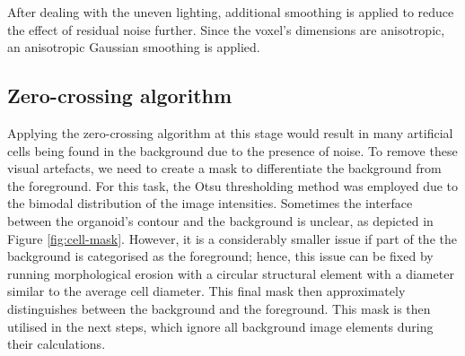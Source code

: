 \documentclass[
  digital,     %
  oneside,     %
  nosansbold,  %
  nocolorbold, %
  lof,         %
  lot,         %
]{fithesis4}
\begin{document}
After dealing with the uneven lighting, additional smoothing is applied
to reduce the effect of residual noise further. Since the voxel's dimensions are
anisotropic, an anisotropic Gaussian smoothing is applied.

\subsection{Zero-crossing algorithm}
Applying the zero-crossing algorithm at this stage would result in many
artificial cells being found in the background due to the presence of noise. To
remove these visual artefacts, we need to create a mask to differentiate the
background from the foreground. For this task, the Otsu thresholding method was
employed due to the bimodal distribution of the image intensities. Sometimes the interface between
the organoid's contour and the background is unclear, as depicted in Figure
\ref{fig:cell-mask}. However, it is a considerably smaller issue if part of the
the background is categorised as the foreground; hence, this issue can be fixed by
running morphological erosion with a circular structural element with a diameter similar to the average cell diameter. This final mask then approximately distinguishes between the 
background and the foreground. This mask is then utilised in the next steps, which
ignore all background image elements during their calculations.
\end{document}
